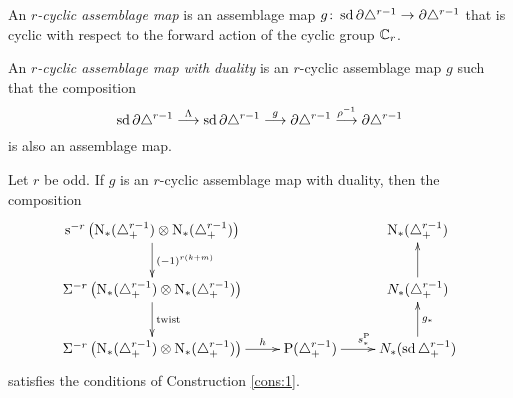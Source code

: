 \begin{definition}
	An \emph{$r$-cyclic assemblage map} is an assemblage map $g \colon  \operatorname{sd} \partial \triangle^{r-1}\to \partial \triangle^{r-1}$ that is cyclic with respect to the forward action of the cyclic group $\mathbb{C}_{r}$.
\end{definition}

\begin{definition}
	An \emph{$r$-cyclic assemblage map with duality} is an $r$-cyclic assemblage map $g$ such that the composition
	\[\operatorname{sd} \partial \triangle^{r-1} \overset{\Lambda}{\longrightarrow} \operatorname{sd} \partial\triangle^{r-1} \overset{g}{\longrightarrow} \partial\triangle^{r-1}\overset{\rho^{-1}}{\longrightarrow} \partial\triangle^{r-1} \]
	is also an assemblage map.
\end{definition}

\begin{proposition}\label{prop:assemblage}
	Let $r$ be odd. If $g$ is an $r$-cyclic assemblage map with duality, then the composition
	\[\xymatrix{
		\sus{-r}\left(\chains(\asimplex^{r-1}) \ot  \chains(\asimplex^{r-1})\right)\ar[d]^{(-1)^{r(k+m)}}&&
		\chains(\asimplex^{r-1})
		\\
		\susp{-r}\left(\chains(\asimplex^{r-1}) \ot  \chains(\asimplex^{r-1})\right)\ar[d]^-{\twist} &&
		\cadenas(\asimplex^{r-1})\ar[u]
		\\
		\susp{-r}\left(\chains(\asimplex^{r-1}) \ot  \chains(\asimplex^{r-1})\right)\ar[r]^-{h} &
		\Psd(\asimplex^{r-1}) \ar[r]^{s_*^{\Psd}} &
		\cadenas(\sd\asimplex^{r-1})\ar[u]_{g_*}
	}
	\]
	satisfies the conditions of Construction \ref{cons:1}.
\end{proposition}

